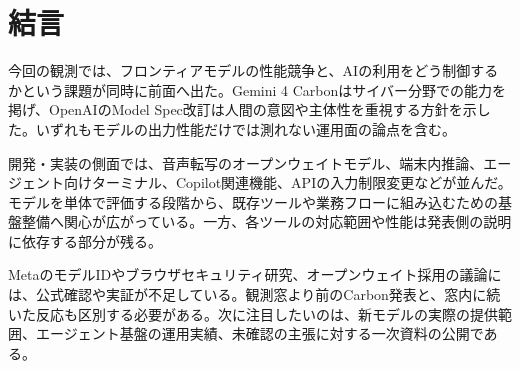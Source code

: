 \section*{結言}
今回の観測では、フロンティアモデルの性能競争と、AIの利用をどう制御するかという課題が同時に前面へ出た。Gemini 4 Carbonはサイバー分野での能力を掲げ、OpenAIのModel Spec改訂は人間の意図や主体性を重視する方針を示した。いずれもモデルの出力性能だけでは測れない運用面の論点を含む。

開発・実装の側面では、音声転写のオープンウェイトモデル、端末内推論、エージェント向けターミナル、Copilot関連機能、APIの入力制限変更などが並んだ。モデルを単体で評価する段階から、既存ツールや業務フローに組み込むための基盤整備へ関心が広がっている。一方、各ツールの対応範囲や性能は発表側の説明に依存する部分が残る。

MetaのモデルIDやブラウザセキュリティ研究、オープンウェイト採用の議論には、公式確認や実証が不足している。観測窓より前のCarbon発表と、窓内に続いた反応も区別する必要がある。次に注目したいのは、新モデルの実際の提供範囲、エージェント基盤の運用実績、未確認の主張に対する一次資料の公開である。
